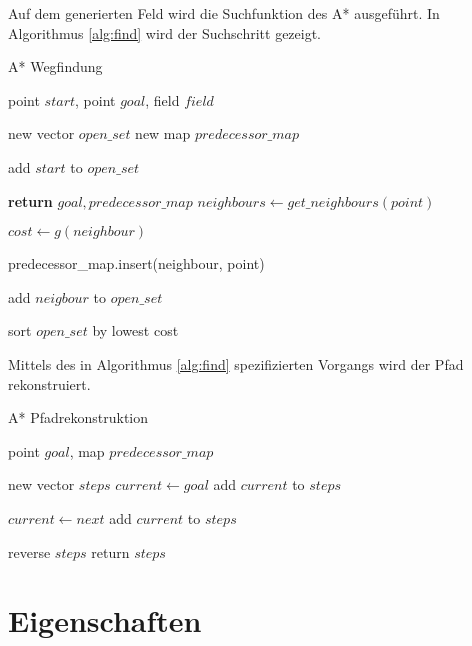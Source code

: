 \documentclass[10pt,twocolumn]{scrartcl}
\begin{document}
Auf dem generierten Feld wird die Suchfunktion des A* ausgeführt. In Algorithmus \ref{alg:find} wird der Suchschritt gezeigt.

\begin{algorithm} 
\caption{A* Wegfindung} 
\label{alg:find} 
\begin{algorithmic}
	\REQUIRE point $start$, point $goal$, field $field$ 	
	
	\STATE new vector $open\_set$
	\STATE new map $predecessor\_map$ 
	
	\STATE add $start$ to $open\_set$
	
	\STATE \textbf{return} $goal, predecessor\_map$	
	\ENDIF
	\STATE $neighbours \leftarrow get\_neighbours(point)$
	
	
	\STATE $cost \leftarrow	g(neighbour)$
	

	\STATE predecessor_map.insert(neighbour, point)
	
	\STATE add $neigbour$ to $open\_set$	
	
	\ENDIF
	
	\STATE sort $open\_set$ by lowest cost		
		
	\ENDFOR
	\ENDWHILE
\end{algorithmic}
\end{algorithm}

Mittels des in Algorithmus \ref{alg:find} spezifizierten Vorgangs wird der Pfad rekonstruiert.

\begin{algorithm} 
\caption{A* Pfadrekonstruktion} 
\label{alg:rec} 
\begin{algorithmic}
	\REQUIRE point $goal$, map $predecessor\_map$
	
	\STATE new vector $steps$	
	\STATE $current \leftarrow goal$
	\STATE add $current$ to $steps$
	
	
	\STATE $current \leftarrow next$
	\STATE add $current$ to $steps$

	\ENDWHILE
	\STATE reverse $steps$
	\STATE return $steps$
	
\end{algorithmic}
\end{algorithm}

\section*{Eigenschaften}
\end{document}
